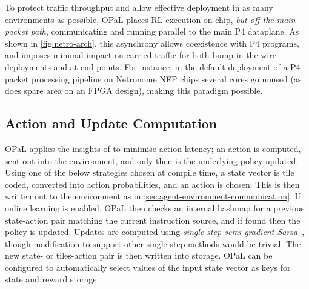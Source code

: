 \documentclass[
sigconf,natbib=false
]{acmart}
\newcommand{\approachshort}{OPaL}
\begin{document}

To protect traffic throughput and allow effective deployment in as many environments as possible, \approachshort{} places RL execution on-chip, \emph{but off the main packet path}, communicating and running parallel to the main P4 dataplane.
As shown in \cref{fig:netro-arch}, this asynchrony allows coexistence with P4 programs, and imposes minimal impact on carried traffic for both bump-in-the-wire deployments and at end-points.
For instance, in the default deployment of a P4 packet processing pipeline on Netronome NFP chips several cores go unused (as does spare area on an FPGA design), making this paradigm possible.

%

\subsection{Action and Update Computation}\label{sec:action-and-update-computation}
\approachshort{} applies the insights of \textcite{DBLP:journals/firai/TravnikMSP18} to minimise action latency; an action is computed, sent out into the environment, and only then is the underlying policy updated.
Using one of the below strategies chosen at compile time, a state vector is tile coded, converted into action probabilities, and an action is chosen.
This is then written out to the environment as in \cref{sec:agent-environment-communication}.
If online learning is enabled, \approachshort{} then checks an internal hashmap for a previous state-action pair matching the current instruction source, and if found then the policy is updated.
Updates are computed using \emph{single-step semi-gradient Sarsa}~\cite[pp. \numrange{217}{221}]{RL2E}, though modification to support other single-step methods would be trivial.
The new state- or tiles-action pair is then written into storage.
\approachshort{} can be configured to automatically select values of the input state vector as keys for state and reward storage.
\end{document}
